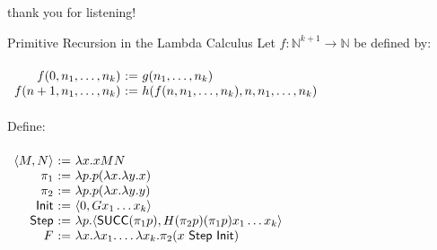\documentclass{beamer}
\newcommand{\vs}{\\~\\}
\begin{document}
\begin{frame}
  \centering
  thank you for listening!
\end{frame}

\begin{frame}{Primitive Recursion in the Lambda Calculus}
  Let $f:\mathbb{N}^{k+1}\to\mathbb{N}$ be defined by:
  \vs
  \begin{math}
    \begin{array}{r@{~:=~}l}
      f(0, n_1, \ldots, n_k) & g(n_1, \ldots, n_k) \\
      f(n+1, n_1, \ldots, n_k) & h(f(n, n_1, \ldots, n_k), n, n_1, \ldots, n_k)
    \end{array}
  \end{math}
  \vs
  Define:
  \vs
  \begin{math}
    \begin{array}{r@{~:=~}l}
      \langle M, N\rangle
      &
      \lambda x.x M N
      \\
      \pi_1
      &
      \lambda p.p(\lambda x.\lambda y.x)
      \\
      \pi_2
      &
      \lambda p.p(\lambda x.\lambda y.y)
      \\
      \mathsf{Init}
      &
      \langle 0,G x_1 \ldots x_k \rangle
      \\
      \mathsf{Step}
      &
      \lambda p.\langle \mathsf{SUCC}(\pi_1 p),H(\pi_2 p)(\pi_1 p)x_1\ldots x_k\rangle
      \\
      F
      &
      \lambda x.\lambda x_1.\ldots\lambda x_k.\pi_2(x~\mathsf{Step}~\mathsf{Init})
    \end{array}
  \end{math}

\end{frame}
\end{document}
